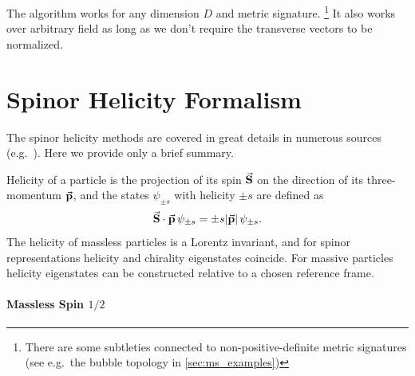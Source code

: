 The algorithm works for any dimension $D$ and metric signature.%
\footnote{There are some subtleties connected to non-positive-definite metric signatures (see e.g.\ the bubble topology in \cref{sec:ms_examples})}
It also works over arbitrary field as long as we don't require the transverse vectors to be normalized.


\chapter{Spinor Helicity Formalism}
\label{chap:4dspinhel}

The spinor helicity methods are covered in great details in numerous sources (e.g.\ \cite{Maitre:2007jq,Kuczmarski:2014ara,Weinzierl:2016bus,DittmaierWeyl,Cohen:2010mi,Schwinn2006a}).
Here we provide only a brief summary.

Helicity of a particle is the projection of its spin $\va{S}$ on the direction of its
three-momentum $\va{p}$, and the states $\psi_{\pm s}$ with helicity $\pm s$ are defined as
\begin{equation} \label{eq:helicity_def}
  \sp(\va{S},\va{p}) \, \psi_{\pm s} = \pm s \abs{\va{p}}\, \psi_{\pm s}.
\end{equation}
The helicity of massless particles is a Lorentz invariant, and for spinor representations helicity and chirality eigenstates
coincide. 
For massive particles helicity eigenstates can be constructed relative to a chosen reference frame.


\subsubsection{Massless Spin $1/2$}

